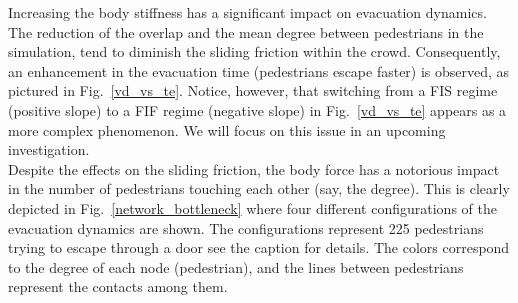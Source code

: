 \documentclass[preprint,12pt]{elsarticle}
\begin{document}
Increasing the body stiffness has a significant impact on 
evacuation dynamics. The reduction of the overlap and the mean degree between 
pedestrians in the simulation, tend to diminish the sliding 
friction within the crowd. Consequently, an enhancement in the evacuation time 
(pedestrians escape faster) is observed, as pictured in Fig.~\ref{vd_vs_te}. 
Notice, however, that switching from a FIS regime (positive slope) to a  FIF 
regime (negative slope) in Fig.~\ref{vd_vs_te} appears as a more complex 
phenomenon. We will focus on this issue in an upcoming investigation.\\

Despite the effects on the sliding friction, the body force 
has a notorious impact in the number of pedestrians touching each other (say, 
the degree). This is clearly depicted in Fig.~\ref{network_bottleneck} where 
four different configurations of the evacuation dynamics are shown. The 
configurations represent 225 pedestrians trying to escape through a door see the 
caption for details. The colors correspond to the degree of each node 
(pedestrian), and the lines between pedestrians represent the contacts among 
them.\\
\end{document}
